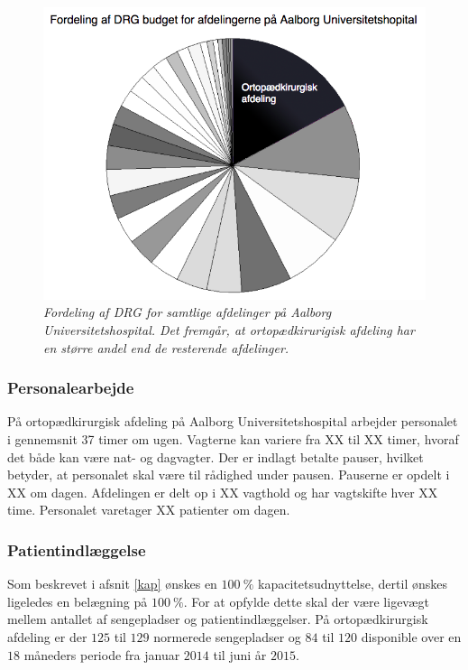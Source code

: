 \begin{figure}[H]
	\flushleft 
	\centering
	\includegraphics[scale=0.45]{figures/Ortopaeddiagram.png}
	\flushleft
	\caption{\textit{Fordeling af DRG for samtlige afdelinger på Aalborg Universitetshospital. Det fremgår, at ortopædkirurigisk afdeling har en større andel end de resterende afdelinger.}\cite{Rasmussen2016}}
	\label{DRG_budget}
\end{figure}


\subsubsection{Personalearbejde} 
På ortopædkirurgisk afdeling på Aalborg Universitetshospital arbejder personalet i gennemsnit 37 timer om ugen\cite{Danske2015}. Vagterne kan variere fra XX til XX timer, hvoraf det både kan være nat- og dagvagter. Der er indlagt betalte pauser, hvilket betyder, at personalet skal være til rådighed under pausen. Pauserne er opdelt i XX om dagen. Afdelingen er delt op i XX vagthold og har vagtskifte hver XX time. Personalet varetager XX patienter om dagen. 

\subsubsection{Patientindlæggelse}
Som beskrevet i afsnit \ref{kap} ønskes en $100~\%$ kapacitetsudnyttelse, dertil ønskes ligeledes en belægning på $100~\%$. 
For at opfylde dette skal der være ligevægt mellem antallet af sengepladser og patientindlæggelser. På ortopædkirurgisk afdeling er der $125$ til $129$ normerede sengepladser og $84$ til $120$ disponible over en $18$ måneders periode fra januar $2014$ til juni år $2015$. 

